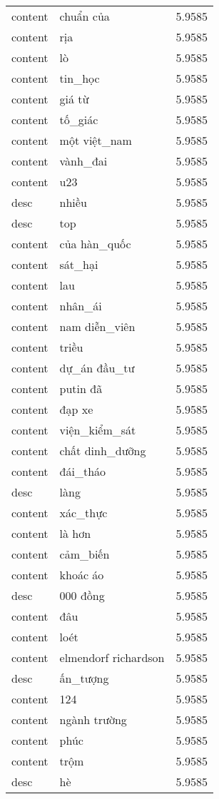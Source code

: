 \documentclass{article}
\begin{document}
\begin{tabular}{lll}
content & chuẩn của & 5.9585\\
content & rịa & 5.9585\\
content & lò & 5.9585\\
content & tin\_học & 5.9585\\
content & giá từ & 5.9585\\
content & tố\_giác & 5.9585\\
content & một việt\_nam & 5.9585\\
content & vành\_đai & 5.9585\\
content & u23 & 5.9585\\
desc & nhiều & 5.9585\\
desc & top & 5.9585\\
content & của hàn\_quốc & 5.9585\\
content & sát\_hại & 5.9585\\
content & lau & 5.9585\\
content & nhân\_ái & 5.9585\\
content & nam diễn\_viên & 5.9585\\
content & triều & 5.9585\\
content & dự\_án đầu\_tư & 5.9585\\
content & putin đã & 5.9585\\
content & đạp xe & 5.9585\\
content & viện\_kiểm\_sát & 5.9585\\
content & chất dinh\_dưỡng & 5.9585\\
content & đái\_tháo & 5.9585\\
desc & làng & 5.9585\\
content & xác\_thực & 5.9585\\
content & là hơn & 5.9585\\
content & cảm\_biến & 5.9585\\
content & khoác áo & 5.9585\\
desc & 000 đồng & 5.9585\\
content & đâu & 5.9585\\
content & loét & 5.9585\\
content & elmendorf richardson & 5.9585\\
desc & ấn\_tượng & 5.9585\\
content & 124 & 5.9585\\
content & ngành trường & 5.9585\\
content & phúc & 5.9585\\
content & trộm & 5.9585\\
desc & hè & 5.9585\\

\end{tabular}
\end{document}
